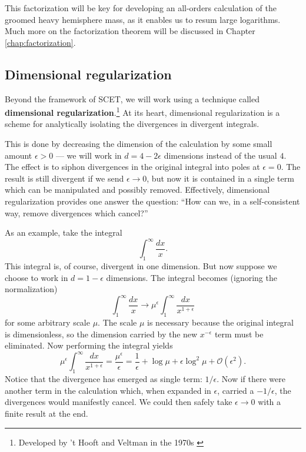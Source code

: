 \documentclass[../thesis.tex]{subfiles}
\providecommand{\cO}{\mathcal{O}}
\begin{document}
	This factorization will be key for developing an all-orders calculation of the groomed heavy hemisphere mass, as it enables us to resum large logarithms. Much more on the factorization theorem will be discussed in Chapter \ref{chap:factorization}.

\subsection{Dimensional regularization}
	Beyond the framework of SCET, we will work using a technique called \textbf{dimensional regularization}.\footnote{Developed by 't Hooft and Veltman in the 1970s \cite{t_hooft_regularization_1972}} At its heart, dimensional regularization is a scheme for analytically isolating the divergences in divergent integrals. 

	This is done by decreasing the dimension of the calculation by some small amount $\epsilon > 0$ --- we will work in $d = 4 - 2\epsilon$ dimensions instead of the usual $4$. The effect is to siphon divergences in the original integral into poles at $\epsilon = 0$. The result is still divergent if we send $\epsilon \to 0$, but now it is contained in a single term which can be manipulated and possibly removed. Effectively, dimensional regularization provides one answer the question: ``How can we, in a self-consistent way, remove divergences which cancel?''

	As an example, take the integral
	\begin{equation}
		\int_1^\infty \frac{dx}{x}.
	\end{equation}
	This integral is, of course, divergent in one dimension. But now suppose we choose to work in $d = 1 - \epsilon$ dimensions. The integral becomes (ignoring the normalization)
	\begin{equation}
		\int_1^\infty \frac{dx}{x} \to \mu^\epsilon \int_1^\infty \frac{dx}{x^{1 + \epsilon}}
	\end{equation}
	for some arbitrary scale $\mu$. The scale $\mu$ is necessary because the original integral is dimensionless, so the dimension carried by the new $x^{-\epsilon}$ term must be eliminated. Now performing the integral yields
	\begin{equation}
		\mu^\epsilon \int_1^\infty \frac{dx}{x^{1 + \epsilon}} = \frac{\mu^\epsilon}{\epsilon} = \frac{1}{\epsilon} + \log \mu + \epsilon \log^2 \mu + \cO(\epsilon^2).
	\end{equation}
	Notice that the divergence has emerged as single term: $1/\epsilon$. Now if there were another term in the calculation which, when expanded in $\epsilon$, carried a $-1/\epsilon$, the divergences would manifestly cancel. We could then safely take $\epsilon \to 0$ with a finite result at the end.
\end{document}
